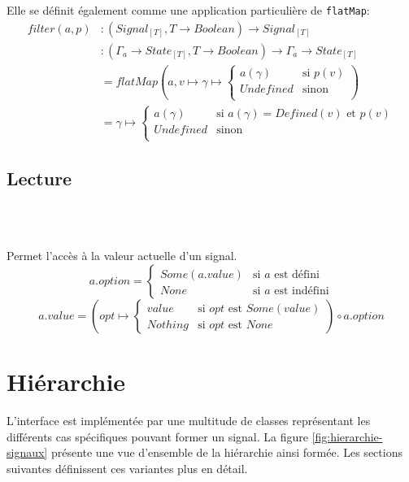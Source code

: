 		Elle se définit également comme une application particulière de \texttt{flatMap}:
		\begin{align*}
			filter(a, p)
				&\colon (Signal_{[T]}, T \to Boolean) \to Signal_{[T]} \\
				&\colon (\Gamma_a \to State_{[T]}, T \to Boolean) \to \Gamma_a \to State_{[T]} \\
				&= flatMap \left( a, v \mapsto \gamma \mapsto \begin{cases}
					a(\gamma) & \text{si } p(v)\\
					Undefined & \text{sinon}\\
				\end{cases} \right)\\
				&= \gamma \mapsto \begin{cases}
					a(\gamma) & \text{si } a(\gamma) = Defined(v) \text{ et } p(v)\\
					Undefined & \text{sinon}\\
				\end{cases}
		\end{align*}
		
	\subsection{Lecture}
	
		\begin{center}
			\\
			\\
		\end{center}
	
		Permet l'accès à la valeur actuelle d'un signal.
		\[
			a.option = \begin{cases}
				Some(a.value) & \text{si } a \text{ est défini}\\
				None & \text{si } a \text{ est indéfini}
			\end{cases}
		\]
		\[
			a.value = \left(opt \mapsto \begin{cases}
				value & \text{si } opt \text{ est } Some(value)\\
				Nothing & \text{si } opt \text{ est } None
			\end{cases}\right) \circ a.option
		\]

\section{Hiérarchie}
	
	L'interface  est implémentée par une multitude de classes représentant les différents cas spécifiques pouvant former un signal. La figure \ref{fig:hierarchie-signaux} présente une vue d'ensemble de la hiérarchie ainsi formée. Les sections suivantes définissent ces variantes plus en détail.
	
